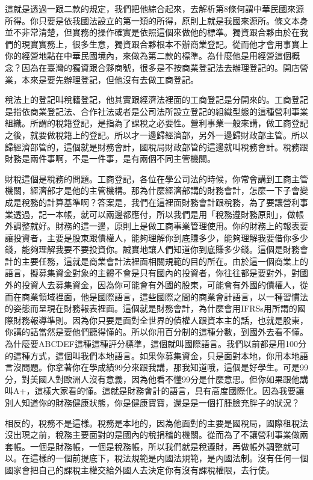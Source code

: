\documentclass[oneside,sub3section]{ctexbook}
\begin{document}
這就是透過一跟二款的規定，我們把他綜合起來，去解析第8條何謂中華民國來源所得。你只要是依我國法設立的第一類的所得，原則上就是我國來源所。條文本身並不非常清楚，但實務的操作確實是依照這個來做他的標準。獨資跟合夥由於在我們的現實實務上，很多生意，獨資跟合夥根本不辦商業登記。從而他才會用事實上你的經營地點在中華民國境內，來做為第二款的標準。為什麼他是用經營這個概念？因為在臺灣的獨資跟合夥商號，很多是不按商業登記法去辦理登記的。開店營業，本來是要先辦理登記，但他沒有去做工商登記。

稅法上的登記叫稅籍登記，他其實跟經濟法裡面的工商登記是分開來的。工商登記是指依商業登記法、合作社法或者是公司法所設立登記的組織型態的這種營利事業組織。所謂的稅籍登記，是指為了課稅之必要性。營利事業一般來講，做工商登記之後，就要做稅籍上的登記。所以才一邊歸經濟部，另外一邊歸財政部主管。所以歸經濟部管的，這個就是財務會計，國稅局財政部管的這邊就叫稅務會計。稅務跟財務是兩件事啊，不是一件事，是有兩個不同主管機關。

財稅這個是稅務的問題。工商登記，各位在學公司法的時候，你常會講到工商主管機關，經濟部才是他的主管機構。那為什麼經濟部講的財務會計，怎麼一下子會變成是稅務的計算基準啊？答案是，我們在這裡面財務會計跟稅務，為了要讓營利事業透過，記一本帳，就可以兩邊都應付，所以我們是用「稅務遵財務原則」，做帳外調整就好。財務的這一邊，原則上是做工商事業管理使用。你的財務上的報表要讓投資者，主要是股東跟債權人，能夠理解你到底賺多少，能夠理解我要借你多少錢，能夠理解我要不要投資你。誠實地讓人們知道你到底賺多少錢。這個是財務會計的主要任務，這就是商業會計法裡面相關規範的目的所在。由於這一個商業上的語言，擬募集資金對象的主體不會是只有國內的投資者，你往往都是要對外，對國外的投資人去募集資金，因為你可能會有外國的股東，可能會有外國的債權人，從而在商業領域裡面，他是國際語言，這些國際之間的商業會計語言，以一種習慣法的姿態而呈現在財務報表裡面。這個就是財務會計，為什麼會用IFRSs用所謂的國際財務報導準則。因為你只要是面對全世界的債權人跟資本主的話，也就是股東，你講的話當然是要他們聽得懂的。所以你用百分制的這種分數，到國外去看不懂。為什麼要ABCDEF這種這種評分標準，這個就叫國際語言。我們以前都是用100分的這種方式，這個叫我們本地語言。如果你募集資金，只是面對本地，你用本地語言沒問題。你拿著你在學成績99分來跟我講，那我知道哦，這個是好學生。可是99分，對美國人對歐洲人沒有意義，因為他看不懂99分是什麼意思。但你如果跟他講叫A+，這樣大家看的懂。這就是財務會計的語言，具有高度國際化。因為我要讓別人知道你的財務健康狀態，你是健康寶寶，還是是一個打腫臉充胖子的狀況？

相反的，稅務不是這樣。稅務是本地的，因為他面對的主要是國稅局，國際租稅法沒出現之前，稅務主要面對的是國內的稅捐稽的機關。從而為了不讓營利事業做兩套帳。一個是財務帳，一個是稅務帳，所以我們就是稅遵財，再做帳外調整就可以。在這樣的一個前提底下，稅法規範是内國法規範，是內國法制。沒有任何一個國家會把自己的課稅主權交給外國人去決定你有沒有課稅權限，去行使。
\end{document}
